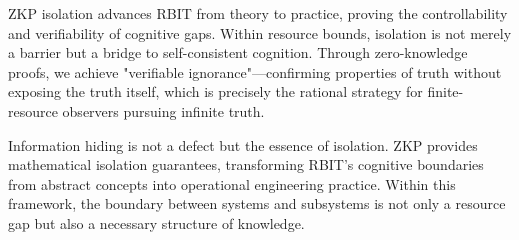 \documentclass[12pt]{article}
\theoremstyle{plain}
\theoremstyle{definition}
\begin{document}
ZKP isolation advances RBIT from theory to practice, proving the controllability and verifiability of cognitive gaps. Within resource bounds, isolation is not merely a barrier but a bridge to self-consistent cognition. Through zero-knowledge proofs, we achieve "verifiable ignorance"—confirming properties of truth without exposing the truth itself, which is precisely the rational strategy for finite-resource observers pursuing infinite truth.

Information hiding is not a defect but the essence of isolation. ZKP provides mathematical isolation guarantees, transforming RBIT's cognitive boundaries from abstract concepts into operational engineering practice. Within this framework, the boundary between systems and subsystems is not only a resource gap but also a necessary structure of knowledge.
\end{document}

